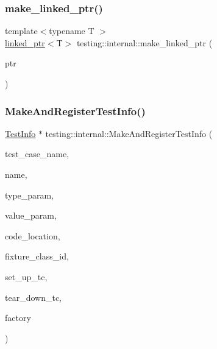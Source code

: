 \mbox{\label{namespacetesting_1_1internal_a0d79fad1f772844eff35dfe955f24fd6}} 
\subsubsection{\texorpdfstring{make\_linked\_ptr()}{make\_linked\_ptr()}}
{\footnotesize\ttfamily template$<$typename T $>$ \\
\mbox{\hyperlink{classtesting_1_1internal_1_1linked__ptr}{linked\+\_\+ptr}}$<$T$>$ testing\+::internal\+::make\+\_\+linked\+\_\+ptr (\begin{DoxyParamCaption}\item[{T $\ast$}]{ptr }\end{DoxyParamCaption})}

\mbox{\label{namespacetesting_1_1internal_a7f2e4e46c969fcae9d801d93a3e932fd}} 
\subsubsection{\texorpdfstring{MakeAndRegisterTestInfo()}{MakeAndRegisterTestInfo()}}
{\footnotesize\ttfamily \mbox{\hyperlink{classtesting_1_1TestInfo}{Test\+Info}} $\ast$ testing\+::internal\+::\+Make\+And\+Register\+Test\+Info (\begin{DoxyParamCaption}\item[{const char $\ast$}]{test\+\_\+case\+\_\+name,  }\item[{const char $\ast$}]{name,  }\item[{const char $\ast$}]{type\+\_\+param,  }\item[{const char $\ast$}]{value\+\_\+param,  }\item[{\mbox{\hyperlink{structtesting_1_1internal_1_1CodeLocation}{Code\+Location}}}]{code\+\_\+location,  }\item[{\mbox{\hyperlink{namespacetesting_1_1internal_ab1114197d3c657d8b7f8e0c5caa12d00}{Type\+Id}}}]{fixture\+\_\+class\+\_\+id,  }\item[{\mbox{\hyperlink{namespacetesting_1_1internal_a30037044c0b57cdd647c7e2e97cb2cff}{Set\+Up\+Test\+Case\+Func}}}]{set\+\_\+up\+\_\+tc,  }\item[{\mbox{\hyperlink{namespacetesting_1_1internal_a085e31321d0d029c04d2a79234f60c1a}{Tear\+Down\+Test\+Case\+Func}}}]{tear\+\_\+down\+\_\+tc,  }\item[{\mbox{\hyperlink{classtesting_1_1internal_1_1TestFactoryBase}{Test\+Factory\+Base}} $\ast$}]{factory }\end{DoxyParamCaption})}

